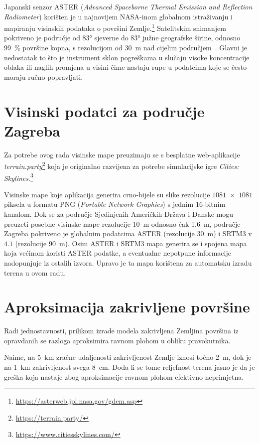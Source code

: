 \documentclass[times, utf8, zavrsni, numeric]{fer}
\begin{document}
		Japanski senzor ASTER (\textit{Advanced Spaceborne Thermal Emission and Reflection Radiometer}) korišten je u najnovijem NASA-inom globalnom istraživanju i mapiranju visinskih podataka o površini Zemlje.\footnote{\url{https://asterweb.jpl.nasa.gov/gdem.asp}}
		Satelitskim snimanjem pokriveno je područje od \ang{83} sjeverne do \ang{83} južne geografske širine, odnosno \SI{99}{\percent} površine kopna, s rezolucijom od \SI{30}{\meter} nad cijelim područjem~\cite{wiki:aster}.
		Glavni je nedostatak to što je instrument sklon pogreškama u slučaju visoke koncentracije oblaka ili naglih promjena u visini čime nastaju rupe u podatcima koje se često moraju ručno popravljati.
	
	
	
	\section{Visinski podatci za područje Zagreba}
	
		Za potrebe ovog rada visinske mape preuzimaju se s besplatne web-aplikacije \textit{terrain.party}\footnote{\url{https://terrain.party/}} koja je originalno razvijena za potrebe simulacijske igre \textit{Cities: Skylines}.\footnote{\url{https://www.citiesskylines.com/}}
		
		Visinske mape koje aplikacija generira crno-bijele su slike rezolucije $1081$~$\times$~$1081$ piksela u formatu PNG (\textit{Portable Network Graphics}) s jednim $16$-bitnim kanalom.
		Dok se za područje Sjedinjenih Američkih Država i Danske mogu preuzeti posebne visinske mape rezolucije \SI{10}{\meter} odnosno čak \SI{1.6}{\meter}, područje Zagreba pokriveno je globalnim podatcima ASTER (rezolucije \SI{30}{\meter}) i SRTM3 v$4.1$ (rezolucije \SI{90}{\meter}).
		Osim ASTER i SRTM3 mapa generira se i spojena mapa koja većinom koristi ASTER podatke, a eventualne nepotpune informacije nadopunjuje iz ostalih izvora.
		Upravo je ta mapa korištena za automatsku izradu terena u ovom radu.
	
	
	
	\section{Aproksimacija zakrivljene površine}
	
		Radi jednostavnosti, prilikom izrade modela zakrivljena Zemljina površina iz opravdanih se razloga aproksimira ravnom plohom u obliku pravokutnika.
		
		Naime, na \SI{5}{\kilo\meter} zračne udaljenosti zakrivljenost Zemlje iznosi točno \SI{2}{\meter}, dok je na \SI{1}{\kilo\meter} zakrivljenost svega \SI{8}{\centi\meter}.
		Doda li se tome reljefnost terena jasno je da je greška koja nastaje zbog aproksimacije ravnom plohom efektivno neprimjetna.
		
\end{document}
